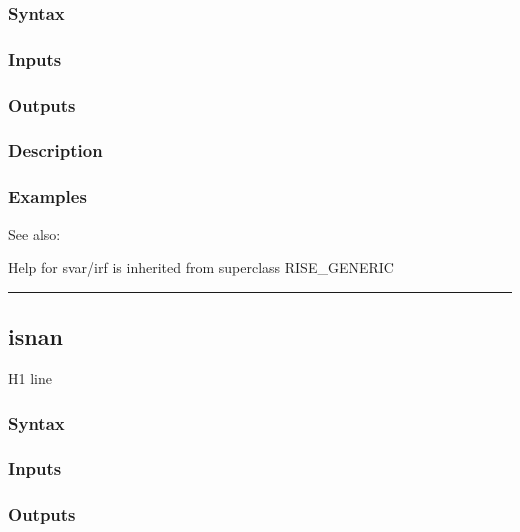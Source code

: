 \documentclass[letterpaper,10pt,english]{sphinxmanual}
\begin{document}
\subsubsection{Syntax}
\label{classes/models/@svar/svar:id31}

\subsubsection{Inputs}
\label{classes/models/@svar/svar:id32}

\subsubsection{Outputs}
\label{classes/models/@svar/svar:id33}

\subsubsection{Description}
\label{classes/models/@svar/svar:id34}

\subsubsection{Examples}
\label{classes/models/@svar/svar:id35}
See also:

Help for svar/irf is inherited from superclass RISE\_GENERIC


\bigskip\hrule{}\bigskip



\subsection{isnan}
\label{classes/models/@svar/svar:id36}\label{classes/models/@svar/svar:isnan}
H1 line


\subsubsection{Syntax}
\label{classes/models/@svar/svar:id37}

\subsubsection{Inputs}
\label{classes/models/@svar/svar:id38}

\subsubsection{Outputs}
\label{classes/models/@svar/svar:id39}
\end{document}
